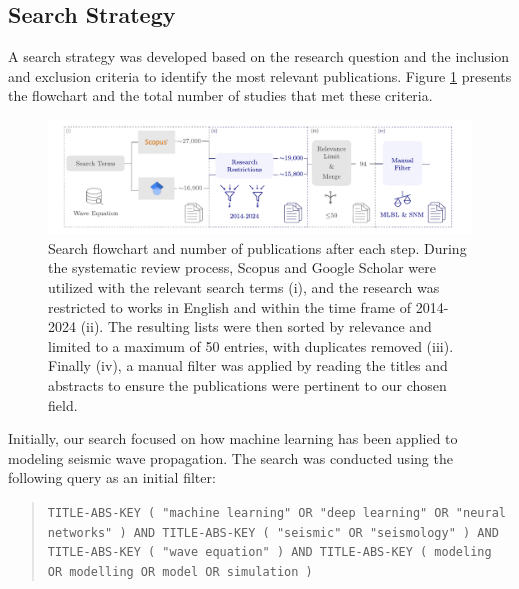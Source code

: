 \documentclass[11pt,twoside]{article}
\begin{document}
\subsection*{Search Strategy}

A search strategy was developed based on the research question and the inclusion and exclusion criteria to 
identify the most relevant publications. Figure \ref{fig:scheme_systematic_review} presents the flowchart and 
the total number of studies that met these criteria.

\begin{figure}[h]
    \includegraphics[width=1.0\textwidth]{figs/scheme_systematic_review.pdf}
\caption{Search flowchart and number of publications after each step. During the systematic review process, 
Scopus and Google Scholar were utilized with the relevant search terms (i), and the research was restricted to works 
in English and within the time frame of 2014-2024 (ii). The resulting lists were then sorted by relevance and limited 
to a maximum of 50 entries, with duplicates removed (iii). Finally (iv), a manual filter was applied by reading the 
titles and abstracts to ensure the publications were pertinent to our chosen field.}\label{fig:scheme_systematic_review}
\end{figure}

Initially, our search focused on how machine learning has been applied to modeling seismic wave propagation. 
The search was conducted using the following query as an initial filter:

\vspace*{2mm}

\begin{tcolorbox}[colback=gray!20, colframe=gray!20, sharp corners]
\begin{quote}
\noindent\texttt{TITLE-ABS-KEY ( "machine learning" OR "deep learning" OR "neural networks" ) 
AND TITLE-ABS-KEY ( "seismic" OR "seismology" ) AND TITLE-ABS-KEY ( "wave equation" ) AND 
TITLE-ABS-KEY ( modeling OR modelling OR model OR simulation )}
\end{quote}
\end{tcolorbox}
\end{document}
